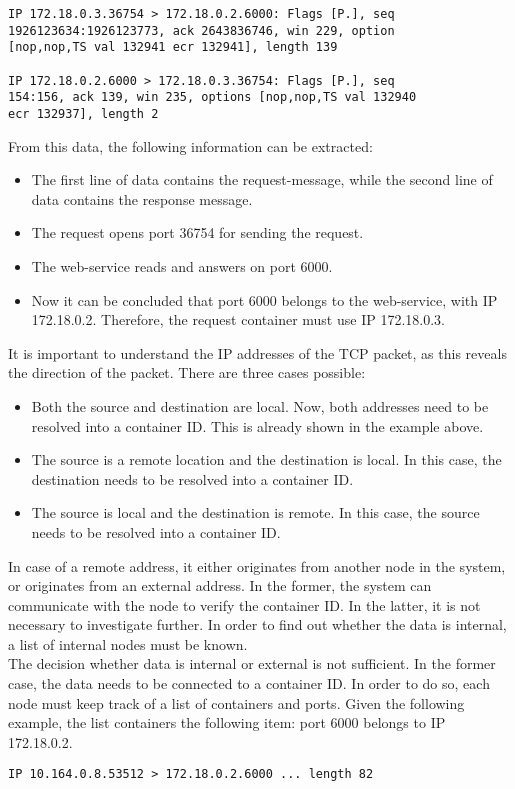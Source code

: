 \begin{verbatim}
IP 172.18.0.3.36754 > 172.18.0.2.6000: Flags [P.], seq
1926123634:1926123773, ack 2643836746, win 229, option
[nop,nop,TS val 132941 ecr 132941], length 139

IP 172.18.0.2.6000 > 172.18.0.3.36754: Flags [P.], seq
154:156, ack 139, win 235, options [nop,nop,TS val 132940 
ecr 132937], length 2
\end{verbatim}
From this data, the following information can be extracted:
\begin{itemize}
    \item The first line of data contains the request-message, while the second line of data contains the response message.    
    \item The request opens port 36754 for sending the request.
    \item The web-service reads and answers on port 6000.
    \item Now it can be concluded that port 6000 belongs to the web-service, with IP 172.18.0.2. Therefore, the request container must use IP 172.18.0.3.
\end{itemize}
It is important to understand the IP addresses of the TCP packet, as this reveals the direction of the packet. There are three cases possible:
\begin{itemize}
    \item Both the source and destination are local. Now, both addresses need to be resolved into a container ID. This is already shown in the example above.
    \item The source is a remote location and the destination is local. In this case, the destination needs to be resolved into a container ID.
    \item The source is local and the destination is remote. In this case, the source needs to be resolved into a container ID.
\end{itemize}

\noindent
In case of a remote address, it either originates from another node in the system, or originates from an external address. In the former, the system can communicate with the node to verify the container ID. In the latter, it is not necessary to investigate further. In order to find out whether the data is internal, a list of internal nodes must be known.\\

\noindent
The decision whether data is internal or external is not sufficient. In the former case, the data needs to be connected to a container ID. In order to do so, each node must keep track of a list of containers and ports. Given the following example, the list containers the following item: port 6000 belongs to IP 172.18.0.2.
\begin{verbatim}
IP 10.164.0.8.53512 > 172.18.0.2.6000 ... length 82
\end{verbatim}

